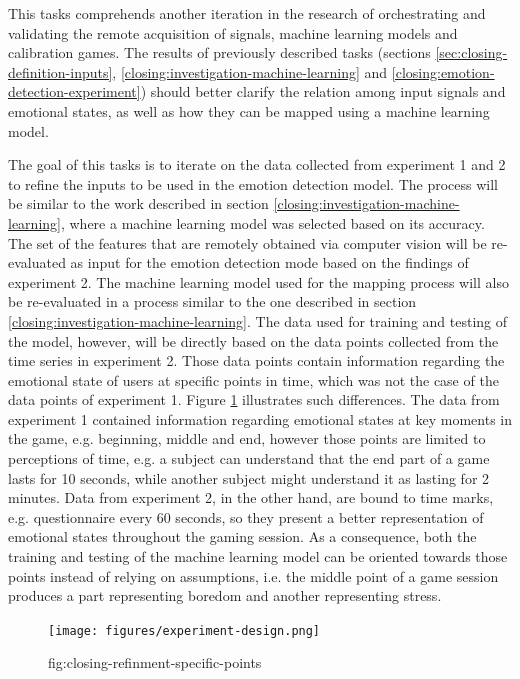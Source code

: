 This tasks comprehends another iteration in the research of orchestrating and validating the remote acquisition of signals, machine learning models and calibration games. The results of previously described tasks (sections \ref{sec:closing-definition-inputs}, \ref{closing:investigation-machine-learning} and \ref{closing:emotion-detection-experiment}) should better clarify the relation among input signals and emotional states, as well as how they can be mapped using a machine learning model.

The goal of this tasks is to iterate on the data collected from experiment 1 and 2 to refine the inputs to be used in the emotion detection model. The process will be similar to the work described in section \ref{closing:investigation-machine-learning}, where a machine learning model was selected based on its accuracy. The set of the features that are remotely obtained via computer vision will be re-evaluated as input for the emotion detection mode based on the findings of experiment 2. The machine learning model used for the mapping process will also be re-evaluated in a process similar to the one described in section \ref{closing:investigation-machine-learning}. The data used for training and testing of the model, however, will be directly based on the data points collected from the time series in experiment 2. Those data points contain information regarding the emotional state of users at specific points in time, which was not the case of the data points of experiment 1. Figure \ref{fig:closing-refinment-specific-points} illustrates such differences. The data from experiment 1 contained information regarding emotional states at key moments in the game, e.g. beginning, middle and end, however those points are limited to perceptions of time, e.g. a subject can understand that the end part of a game lasts for 10 seconds, while another subject might understand it as lasting for 2 minutes. Data from experiment 2, in the other hand, are bound to time marks, e.g. questionnaire every 60 seconds, so they present a better representation of emotional states throughout the gaming session. As a consequence, both the training and testing of the machine learning model can be oriented towards those points instead of relying on assumptions, i.e. the middle point of a game session produces a part representing boredom and another representing stress.

\begin{figure}[ht]
    \centering
    \texttt{[image: figures/experiment-design.png]}
    \caption{fig:closing-refinment-specific-points}
    \label{fig:closing-refinment-specific-points}
\end{figure}

